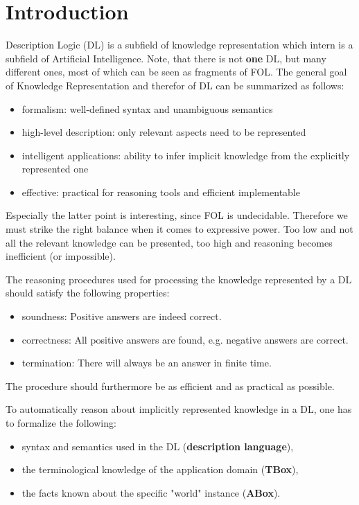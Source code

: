 \chapter{Introduction}
Description Logic (DL) is a subfield of knowledge representation which intern is a subfield of Artificial Intelligence.
Note, that there is not \textbf{one} DL, but many different ones, most of which can be seen as fragments of FOL.
The general goal of Knowledge Representation and therefor of DL can be summarized as follows:
\begin{itemize}
	\item formalism: well-defined syntax and unambiguous semantics
	\item high-level description: only relevant aspects need to be represented
	\item intelligent applications: ability to infer implicit knowledge from the explicitly represented one
	\item effective: practical for reasoning tools and efficient implementable
\end{itemize}
Especially the latter point is interesting, since FOL is undecidable.
Therefore we must strike the right balance when it comes to expressive power.
Too low and not all the relevant knowledge can be presented, too high and reasoning becomes inefficient (or impossible).

The reasoning procedures used for processing the knowledge represented by a DL should satisfy the following properties:
\begin{itemize}
	\item soundness: Positive answers are indeed correct. 
	\item correctness: All positive answers are found, e.g. negative answers are correct.
	\item termination: There will always be an answer in finite time.
\end{itemize}
The procedure should furthermore be as efficient and as practical as possible.

To automatically reason about implicitly represented knowledge in a DL, one has to formalize the following:
\begin{itemize}
	\item syntax and semantics used in the DL (\textbf{description language}),
	\item the terminological knowledge of the application domain (\textbf{TBox}),
	\item the facts known about the specific "world" instance (\textbf{ABox}).
\end{itemize}

